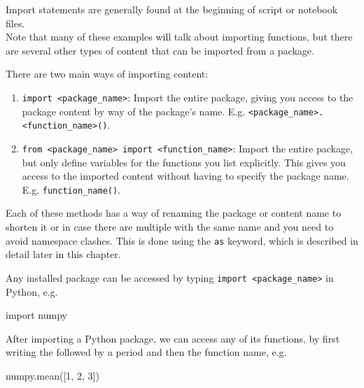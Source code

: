 \documentclass[]{Nemilov}
\newenvironment{Shaded}{\begin{snugshade}}{\end{snugshade}}
\newcommand{\DecValTok}[1]{\textcolor[rgb]{0.00,0.00,0.81}{#1}}
\newcommand{\ImportTok}[1]{#1}
\newcommand{\NormalTok}[1]{#1}
\providecommand{\tightlist}{%
  \setlength{\itemsep}{0pt}\setlength{\parskip}{0pt}}
\begin{document}
Import statements are generally found at the beginning of script or notebook files.\\
Note that many of these examples will talk about importing functions, but there are
several other types of content that can be imported from a package.

There are two main ways of importing content:

\begin{enumerate}
\def\labelenumi{\arabic{enumi}.}
\tightlist
\item
  \texttt{import\ \textless{}package\_name\textgreater{}}: Import the entire package, giving you access to the
  package content by way of the package's name. E.g. \texttt{\textless{}package\_name\textgreater{}.\textless{}function\_name\textgreater{}()}.
\item
  \texttt{from\ \textless{}package\_name\textgreater{}\ import\ \textless{}function\_name\textgreater{}}: Import the entire package, but only define variables for the functions you list explicitly.
  This gives you access to the imported content
  without having to specify the package name. E.g. \texttt{function\_name()}.
\end{enumerate}

Each of these methods has a way of renaming the package or content name to shorten
it or in case there are multiple with the same name and you need to avoid namespace clashes.
This is done using the \texttt{as} keyword, which is described in detail later in this chapter.

Any installed package can be accessed by typing \texttt{import\ \textless{}package\_name\textgreater{}} in Python, e.g.

\begin{Shaded}
\begin{Highlighting}[]
\ImportTok{import}\NormalTok{ numpy}
\end{Highlighting}
\end{Shaded}

After importing a Python package, we can access any of its functions, by first
writing the followed by a period and then the function name, e.g.

\begin{Shaded}
\begin{Highlighting}[]
\NormalTok{numpy.mean([}\DecValTok{1}\NormalTok{, }\DecValTok{2}\NormalTok{, }\DecValTok{3}\NormalTok{])}
\end{Highlighting}
\end{Shaded}
\end{document}

